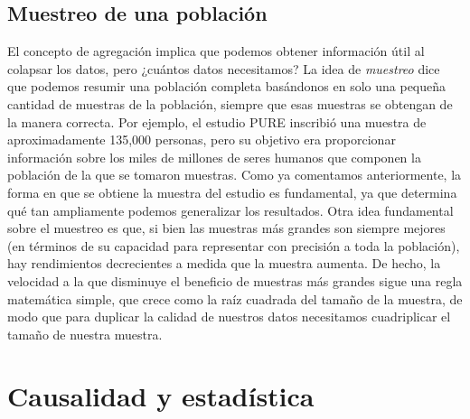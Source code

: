\documentclass[
  12pt,
]{book}
\begin{document}
\hypertarget{muestreo-de-una-poblaciuxf3n}{%
\subsection{Muestreo de una población}\label{muestreo-de-una-poblaciuxf3n}}

El concepto de agregación implica que podemos obtener información útil al colapsar los datos, pero ¿cuántos datos necesitamos? La idea de \emph{muestreo} dice que podemos resumir una población completa basándonos en solo una pequeña cantidad de muestras de la población, siempre que esas muestras se obtengan de la manera correcta. Por ejemplo, el estudio PURE inscribió una muestra de aproximadamente 135,000 personas, pero su objetivo era proporcionar información sobre los miles de millones de seres humanos que componen la población de la que se tomaron muestras. Como ya comentamos anteriormente, la forma en que se obtiene la muestra del estudio es fundamental, ya que determina qué tan ampliamente podemos generalizar los resultados. Otra idea fundamental sobre el muestreo es que, si bien las muestras más grandes son siempre mejores (en términos de su capacidad para representar con precisión a toda la población), hay rendimientos decrecientes a medida que la muestra aumenta. De hecho, la velocidad a la que disminuye el beneficio de muestras más grandes sigue una regla matemática simple, que crece como la raíz cuadrada del tamaño de la muestra, de modo que para duplicar la calidad de nuestros datos necesitamos cuadriplicar el tamaño de nuestra muestra.

\hypertarget{causalidad-y-estaduxedstica}{%
\section{Causalidad y estadística}\label{causalidad-y-estaduxedstica}}
\end{document}
